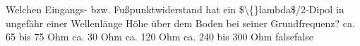     {Welchen Eingangs- bzw. Fußpunktwiderstand hat ein \$\textbackslash\{\}lambda\$/2-Dipol in ungefähr einer Wellenlänge Höhe über dem Boden bei seiner Grundfrequenz?}
    {ca. 65 bis 75 Ohm}
    {ca. 30 Ohm}
    {ca. 120 Ohm}
    {ca. 240 bis 300 Ohm}
    {false}{false}